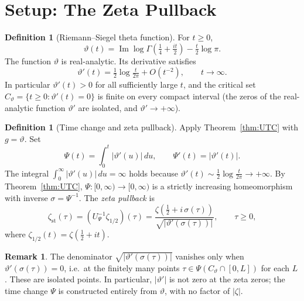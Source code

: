 \documentclass[11pt]{article}
\theoremstyle{definition}
\newtheorem{definition}[theorem]{Definition}
\newtheorem{remark}[theorem]{Remark}
\begin{document}
\section{Setup: The Zeta Pullback}

\begin{definition}[Riemann--Siegel theta function]
\label{def:theta}
For $t\ge 0$,
\[
\vartheta(t)=\operatorname{Im}\log\Gamma\!\left(\tfrac14+\tfrac{it}{2}\right)
-\tfrac{t}{2}\log\pi.
\]
The function $\vartheta$ is real-analytic.  Its derivative satisfies
\begin{equation}\label{eq:thetaprime_asy}
\vartheta'(t)=\tfrac12\log\tfrac{t}{2\pi}+O(t^{-2}),\qquad t\to\infty.
\end{equation}
In particular $\vartheta'(t)>0$ for all sufficiently large $t$, and the
critical set $C_\vartheta=\{t\ge 0:\vartheta'(t)=0\}$ is finite on
every compact interval (the zeros of the real-analytic function
$\vartheta'$ are isolated, and $\vartheta'\to+\infty$).
\end{definition}

\begin{definition}[Time change and zeta pullback]
\label{def:pullback}
Apply Theorem~\ref{thm:UTC} with $g=\vartheta$.  Set
\[
\Psi(t)=\int_0^t|\vartheta'(u)|\,du,\qquad \Psi'(t)=|\vartheta'(t)|.
\]
The integral $\int_0^\infty|\vartheta'(u)|\,du=\infty$ holds because
$\vartheta'(t)\sim\tfrac12\log\tfrac{t}{2\pi}\to+\infty$.  By
Theorem~\ref{thm:UTC}, $\Psi:[0,\infty)\to[0,\infty)$ is a strictly
increasing homeomorphism with inverse $\sigma=\Psi^{-1}$.  The
\emph{zeta pullback} is
\begin{equation}\label{eq:zst}
\zeta_{\mathrm{st}}(\tau)
=(U_\Psi^{-1}\zeta_{1/2})(\tau)
=\frac{\zeta\!\left(\tfrac12+i\,\sigma(\tau)\right)}
      {\sqrt{|\vartheta'(\sigma(\tau))|}},
\qquad\tau\ge 0,
\end{equation}
where $\zeta_{1/2}(t)=\zeta(\tfrac12+it)$.
\end{definition}

\begin{remark}
The denominator $\sqrt{|\vartheta'(\sigma(\tau))|}$ vanishes only when
$\vartheta'(\sigma(\tau))=0$, i.e.\ at the finitely many points
$\tau\in\Psi(C_\vartheta\cap[0,L])$ for each $L$.  These are isolated
points.  In particular, $|\vartheta'|$ is not zero at the zeta zeros;
the time change $\Psi$ is constructed entirely from $\vartheta$, with
no factor of $|\zeta|$.
\end{remark}
\end{document}
